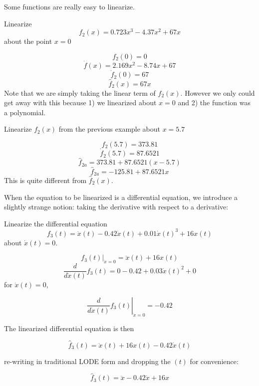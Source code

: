 Some functions are really easy to linearize.

\begin{ExampleSmall}
Linearize
\[
f_2(x) = 0.723x^3 -4.37x^2 +67x
\]
about the point $x=0$
\vspace{0.2in}

\[
f_2(0) = 0
\]
\[
\dot{f}(x) = 2.169x^2 - 8.74x + 67
\]
\[
\dot{f}_2(0) = 67
\]
\[
\hat{f}_2(x) =  67x
\]
Note that we are simply taking the linear term of $f_2(x)$.   However we only could get away with this because 1) we linearized about $x=0$ and 2) the function was a polynomial.
\end{ExampleSmall}

\begin{ExampleSmall}
Linearize $f_2(x)$ from the previous example about $x=5.7$
\vspace{0.2in}

\[
f_2(5.7) = 373.81
\]
\[
\dot{f}_2(5.7) = 87.6521
\]
\[
\hat{f}_{2a} = 373.81 + 87.6521(x-5.7)
\]
\[
\hat{f}_{2a} = -125.81 + 87.6521x
\]
This is quite different from $\hat{f}_2(x)$.

\end{ExampleSmall}


When the equation to be linearized is a differential equation, we introduce a slightly strange notion: taking the derivative with respect to a derivative:

\begin{ExampleSmall}
Linearize the differential equation
\[
f_3(t) =   \ddot{x}(t) - 0.42\dot{x}(t) + 0.01\dot{x}(t)^3 + 16x(t)
\]
about $\dot{x}(t) = 0$.

\vspace{0.2in}
\[
\left . f_3(t) \right |_{\dot{x} = 0} = \ddot{x}(t) + 16x(t)
\]
\[
\frac{d}{d\dot{x}(t)}f_3(t) = 0 - 0.42 + 0.03\dot{x}(t)^2 + 0
\]
for $\dot{x}(t) = 0$,

\[
\left . \frac{d}{d\dot{x}(t)}f_3(t)\right |_{\dot{x} = 0} =   - 0.42
\]

The linearized differential equation is then

\[
\hat{f}_3(t) = \ddot{x}(t) + 16x(t) -0.42\dot{x}(t)
\]

re-writing in traditional LODE form and dropping the $(t)$ for convenience:

\[
\hat{f}_3(t) = \ddot{x} -0.42\dot{x} + 16x
\]




\end{ExampleSmall}

